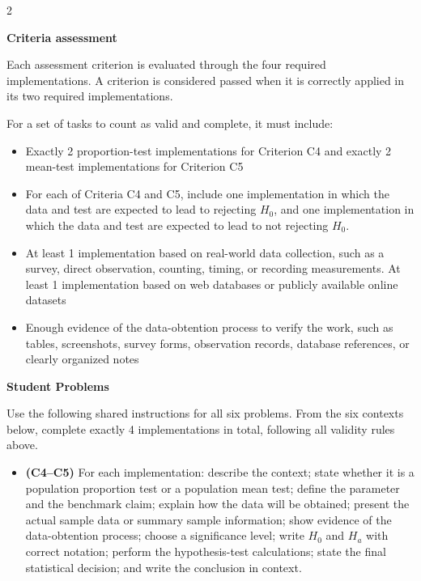 \documentclass[12pt]{article}
\newcommand{\SubsectionBox}[1]{%
\noindent\colorbox{gray!30}{%
\parbox{\linewidth}{\textbf{#1}}%
}\par\vspace{0.35cm}%
}
\begin{document}
\begin{multicols}{2}
	\SubsectionBox{Criteria assessment}\vspace{-0.25cm}
	Each assessment criterion is evaluated through the four required implementations. A criterion is considered passed when it is correctly applied in its two required implementations.
	
	For a set of tasks to count as valid and complete, it must include:
	\begin{itemize}
		\item Exactly 2 proportion-test implementations for Criterion C4 and exactly 2 mean-test implementations for Criterion C5
		\item For each of Criteria C4 and C5, include one implementation in which the data and test are expected to lead to rejecting \(H_0\), and one implementation in which the data and test are expected to lead to not rejecting \(H_0\).
		\item At least 1 implementation based on real-world data collection, such as a survey, direct observation, counting, timing, or recording measurements. At least 1 implementation based on web databases or publicly available online datasets
		\item Enough evidence of the data-obtention process to verify the work, such as tables, screenshots, survey forms, observation records, database references, or clearly organized notes
	\end{itemize}
	
	\vspace{0.25cm}
	\SubsectionBox{Student Problems}\vspace{-0.25cm}
	
	Use the following shared instructions for all six problems. From the six contexts below, complete exactly 4 implementations in total, following all validity rules above.
	\begin{itemize}
		\item \textbf{(C4--C5)} For each implementation: describe the context; state whether it is a population proportion test or a population mean test; define the parameter and the benchmark claim; explain how the data will be obtained; present the actual sample data or summary sample information; show evidence of the data-obtention process; choose a significance level; write \(H_0\) and \(H_a\) with correct notation; perform the hypothesis-test calculations; state the final statistical decision; and write the conclusion in context.
	\end{itemize}
	

\end{multicols}
\end{document}
